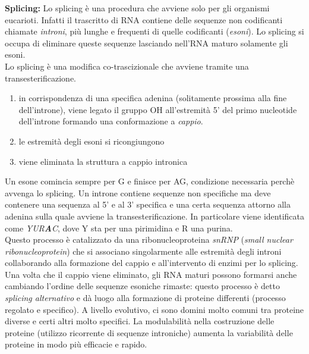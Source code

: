             \textbf{Splicing:}
            Lo splicing è una procedura che avviene solo per gli organismi eucarioti. Infatti il trascritto di RNA contiene delle sequenze non codificanti chiamate \textit{introni}, più lunghe e frequenti di quelle codificanti (\textit{esoni}). 
            Lo splicing si occupa di eliminare queste sequenze lasciando nell'RNA maturo solamente gli esoni.\\
            Lo splicing è una modifica co-trascizionale che avviene tramite una transesterificazione.
            \begin{enumerate}
                \item in corrispondenza di una specifica adenina (solitamente prossima alla fine dell'introne), viene legato il gruppo OH all'estremità 5' del primo nucleotide dell'introne formando una conformazione a \textit{cappio}.
                \item le estremità degli esoni si ricongiungono
                \item viene eliminata la struttura a cappio intronica
            \end{enumerate}
            Un esone comincia sempre per G e finisce per AG, condizione necessaria perchè avvenga lo splicing.
            Un introne contiene sequenze non specifiche ma deve contenere una sequenza al 5' e al 3' specifica e una certa sequenza attorno alla adenina sulla quale avviene la transesterificazione. In particolare viene identificata come \textit{YUR\textbf{A}C}, dove Y sta per una pirimidina e R una purina.\\
            Questo processo è catalizzato da una ribonucleoproteina \textit{snRNP} (\textit{small nuclear ribonucleoprotein}) che si associano singolarmente alle estremità degli introni collaborando alla formazione del cappio e all'intervento di enzimi per lo splicing. \\
            Una volta che il cappio viene eliminato, gli RNA maturi possono formarsi anche cambiando l'ordine delle sequenze esoniche rimaste: questo processo è detto \textit{splicing alternativo} e dà luogo alla formazione di proteine differenti (processo regolato e specifico).
            A livello evolutivo, ci sono domini molto comuni tra proteine diverse e certi altri molto specifici. La modulabilità nella costruzione delle proteine (utilizzo ricorrente di sequenze introniche) aumenta la variabilità delle proteine in modo più efficacie e rapido.
